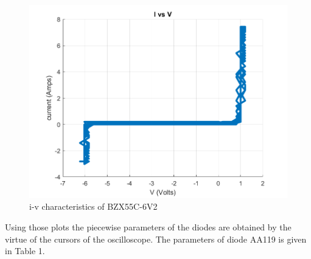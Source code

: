 \documentclass[letterpaper,12pt]{article}
\begin{document}
\begin{figure}[H]
    \centering
    \includegraphics[width=1\textwidth]{1_zener.png}
    \caption{i-v characteristics of BZX55C-6V2}
\end{figure} 


Using those plots the piecewise parameters of the diodes are obtained by the virtue of the cursors of the oscilloscope. The parameters of diode AA119 is given in Table 1.
\end{document}
